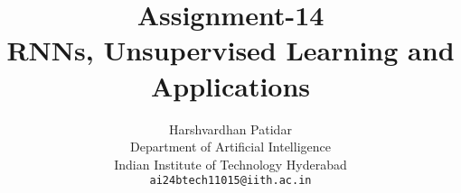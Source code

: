 \documentclass{article}
\title{Assignment-14\\ RNNs, Unsupervised Learning and Applications}
\author{Harshvardhan Patidar\\
  Department of Artificial Intelligence\\
  Indian Institute of Technology Hyderabad\\
  \texttt{ai24btech11015@iith.ac.in}
}
\begin{document}
\



\maketitle






















\end{document}
